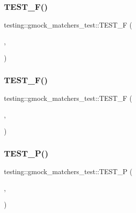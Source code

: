 \subsubsection{\texorpdfstring{TEST\_F()}{TEST\_F()}\hspace{0.1cm}{\footnotesize\ttfamily [39/40]}}
{\footnotesize\ttfamily testing\+::gmock\+\_\+matchers\+\_\+test\+::\+T\+E\+S\+T\+\_\+F (\begin{DoxyParamCaption}\item[{Unordered\+Elements\+Are\+Test}]{,  }\item[{\mbox{\hyperlink{namespacetesting_1_1gmock__matchers__test_a96c18b92dede79060a7303fe5d178faf}{Describe\+Negation}}}]{ }\end{DoxyParamCaption})}

\mbox{\label{namespacetesting_1_1gmock__matchers__test_a7d2395b1cb6a90bdc8d46ae06f99f6c7}} 
\subsubsection{\texorpdfstring{TEST\_F()}{TEST\_F()}\hspace{0.1cm}{\footnotesize\ttfamily [40/40]}}
{\footnotesize\ttfamily testing\+::gmock\+\_\+matchers\+\_\+test\+::\+T\+E\+S\+T\+\_\+F (\begin{DoxyParamCaption}\item[{Bipartite\+Non\+Square\+Test}]{,  }\item[{Simple\+Backtracking}]{ }\end{DoxyParamCaption})}

\mbox{\label{namespacetesting_1_1gmock__matchers__test_a20589d957fcfe5399e249084dbc23e82}} 
\subsubsection{\texorpdfstring{TEST\_P()}{TEST\_P()}\hspace{0.1cm}{\footnotesize\ttfamily [1/3]}}
{\footnotesize\ttfamily testing\+::gmock\+\_\+matchers\+\_\+test\+::\+T\+E\+S\+T\+\_\+P (\begin{DoxyParamCaption}\item[{Bipartite\+Test}]{,  }\item[{Exhaustive}]{ }\end{DoxyParamCaption})}

